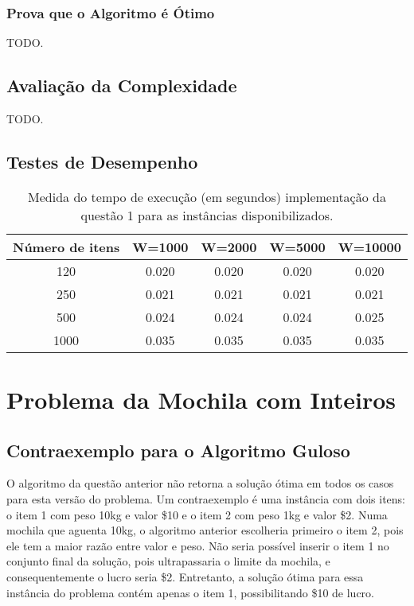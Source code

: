 \documentclass[a4paper]{article}
\begin{document}
\subsubsection{Prova que o Algoritmo é Ótimo}

TODO.

\subsection{Avaliação da Complexidade}

TODO.

\subsection{Testes de Desempenho}

\begin{table}[H]
\centering
\begin{tabular}{c|c|c|c|c}
Número de itens & W=1000 & W=2000 & W=5000 & W=10000 \\
\hline
120 & 0.020	& 0.020	& 0.020	& 0.020	\\
250 & 0.021	& 0.021	& 0.021	& 0.021	\\
500 & 0.024	& 0.024	& 0.024	& 0.025	\\
1000 & 0.035	& 0.035	& 0.035	& 0.035	\\
\end{tabular}
\caption{Medida do tempo de execução (em segundos) implementação da questão 1 para as instâncias disponibilizados.}
\label{tab:q1:bench}
\end{table}

\section{Problema da Mochila com Inteiros}

\subsection{Contraexemplo para o Algoritmo Guloso}

O algoritmo da questão anterior não retorna a solução ótima em todos os casos para esta versão do problema. Um contraexemplo é uma instância com dois itens: o item 1 com peso 10kg e valor \$10 e o item 2 com peso 1kg e valor \$2. Numa mochila que aguenta 10kg, o algoritmo anterior escolheria primeiro o item 2, pois ele tem a maior razão entre valor e peso. Não seria possível inserir o item 1 no conjunto final da solução, pois ultrapassaria o limite da mochila, e consequentemente o lucro seria \$2. Entretanto, a solução ótima para essa instância do problema contém apenas o item 1, possibilitando \$10 de lucro.
\end{document}
